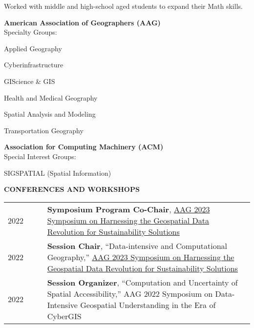 \documentclass{acmcv}
\begin{document}
    \vspace*{-0.25cm}
    \begin{titemize}
    	\titem Worked with middle and high-school aged students to expand their Math skills.
    \end{titemize}



\pagebreak

    \textbf{American Association of Geographers (AAG)} \\
    Specialty Groups: \\ \vspace{-.3cm}
    \begin{multicols}{2}
    \begin{titemize}
        \item Applied Geography
        \item Cyberinfrastructure
        \item GIScience \& GIS
        \item Health and Medical Geography
        \item Spatial Analysis and Modeling
        \item Transportation Geography
    \end{titemize}
    \end{multicols}

    \textbf{Association for Computing Machinery (ACM)} \\
    Special Interest Groups: \\ 
    \begin{titemize}
        \item SIGSPATIAL (Spatial Information)
    \end{titemize}


    \textbf{\uppercase{Conferences and Workshops}}
    \begin{longtable}{p{0.16\linewidth} p{0.84\linewidth}}
        2022 & \textbf{Symposium Program Co-Chair}, \href{https://iguide.illinois.edu/aag-2023-symposium-on-harnessing-the-geospatial-data-revolution-for-sustainability-solutions/}{AAG 2023 Symposium on Harnessing the Geospatial Data Revolution for Sustainability Solutions}\\

        2022 & \textbf{Session Chair}, ``Data-intensive and Computational Geography,'' \href{https://iguide.illinois.edu/aag-2023-symposium-on-harnessing-the-geospatial-data-revolution-for-sustainability-solutions/}{AAG 2023 Symposium on Harnessing the Geospatial Data Revolution for Sustainability Solutions}\\

        2022 & \textbf{Session Organizer}, ``Computation and Uncertainty of Spatial Accessibility,'' AAG 2022 Symposium on Data-Intensive Geospatial Understanding in the Era of CyberGIS\\
    \end{longtable}
\end{document}
